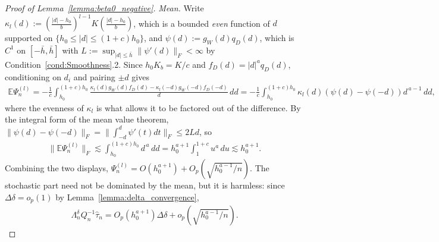 \documentclass{article}
\newcommand{\normm}[1]{\lVert#1\rVert}
\newcommand{\E}{\mathbb{E}}
\begin{document}
\begin{appendices}
\begin{proof}[Proof of Lemma~\ref{lemma:beta0_negative}]
\emph{Mean.} Write $\kappa_l(d):=\left(\tfrac{|d|-h_0}{b}\right)^{l-1}
K\!\left(\tfrac{|d|-h_0}{b}\right)$, which is a bounded \emph{even} function of
$d$ supported on $\{h_0\le|d|\le(1+c)h_0\}$, and $\psi(d):=g_W(d)q_D(d)$, which
is $C^1$ on $[-\bar h,\bar h]$ with $L:=\sup_{|d|\le\bar h}\normm{\psi'(d)}_F<\infty$
by Condition~\ref{cond:Smoothness}.2. Since $h_0K_b=K/c$ and
$f_D(d)=|d|^{a}q_D(d)$, conditioning on $d_i$ and pairing $\pm d$ gives
\begin{align*}
    \E\Psi_n^{(l)}
    = -\frac{1}{c}\int_{h_0}^{(1+c)h_0}
      \frac{\kappa_l(d)g_W(d)f_D(d)-\kappa_l(-d)g_W(-d)f_D(-d)}{d}\,dd
    = -\frac{1}{c}\int_{h_0}^{(1+c)h_0}\kappa_l(d)
      \left(\psi(d)-\psi(-d)\right)d^{\,a-1}\,dd,
\end{align*}
where the evenness of $\kappa_l$ is what allows it to be factored out of the
difference. By the integral form of the mean value theorem,
$\normm{\psi(d)-\psi(-d)}_F=\normm{\int_{-d}^{d}\psi'(t)dt}_F\le 2Ld$, so
\begin{align*}
    \normm{\E\Psi_n^{(l)}}_F
    \lesssim \int_{h_0}^{(1+c)h_0}d^{\,a}\,dd
    = h_0^{a+1}\int_{1}^{1+c}u^{a}\,du\lesssim h_0^{a+1}.
\end{align*}
Combining the two displays, $\Psi_n^{(l)}=O(h_0^{a+1})+O_p(\sqrt{h_0^{a-1}/n})$.
The stochastic part need not be dominated by the mean, but it is harmless:
since $\Delta\delta=o_p(1)$ by Lemma~\ref{lemma:delta_convergence},
\begin{align}\label{eq:Lambda_delta}
    \Lambda_n^{\delta}Q_n^{-1}\hat\tau_n
    = O_p\!\left(h_0^{a+1}\right)\Delta\delta
      + o_p\!\left(\sqrt{h_0^{a-1}/n}\right).
\end{align}



\end{proof}
\end{appendices}
\end{document}
